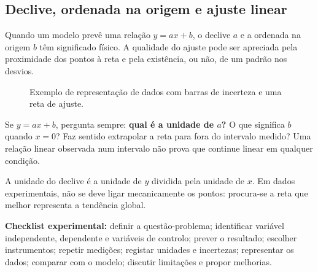 \documentclass[11pt,a4paper,oneside]{book}
\begin{document}
\subsection*{Declive, ordenada na origem e ajuste linear}
Quando um modelo prevê uma relação $y=ax+b$, o declive $a$ e a ordenada na origem $b$ têm significado físico.
 A qualidade do ajuste pode ser apreciada pela proximidade dos pontos à reta e pela existência, ou não, de um padrão nos desvios.

\begin{figure}[H]
\centering
{}
\caption{Exemplo de representação de dados com barras de incerteza e uma reta de ajuste.}
\end{figure}

\begin{leituragrafico}
Se $y=ax+b$, pergunta sempre: \textbf{qual é a unidade de $a$?} O que significa $b$ quando $x=0$? Faz sentido extrapolar a reta para fora do intervalo medido? Uma relação linear observada num intervalo não prova que continue linear em qualquer condição.
\end{leituragrafico} A unidade do declive é a unidade de $y$ dividida pela unidade de $x$. Em dados experimentais, não se deve ligar mecanicamente os pontos: procura-se a reta que melhor representa a tendência global.

\begin{metodo}
\textbf{Checklist experimental:} definir a questão-problema; identificar variável independente, dependente e variáveis de controlo; prever o resultado; escolher instrumentos; repetir medições; registar unidades e incertezas; representar os dados; comparar com o modelo; discutir limitações e propor melhorias.
\end{metodo}
\end{document}
